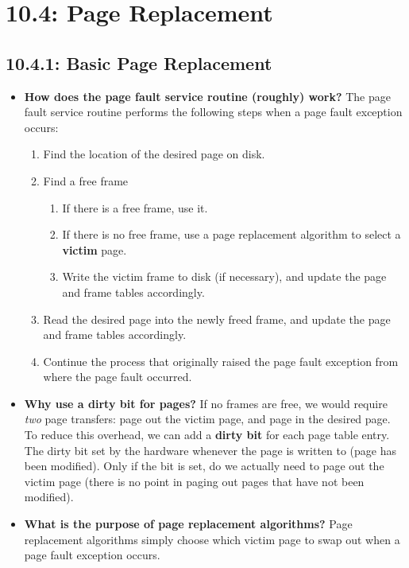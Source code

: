 \documentclass[12pt]{article}
\begin{document}
\section*{10.4: Page Replacement}

\subsection*{10.4.1: Basic Page Replacement}

\begin{itemize}
    \item \textbf{How does the page fault service routine (roughly) work?} The page fault service routine performs the following steps when a page fault exception occurs:
    \begin{enumerate}
        \item Find the location of the desired page on disk.
        \item Find a free frame
        \begin{enumerate}
            \item If there is a free frame, use it.
            \item If there is no free frame, use a page replacement algorithm to select a \textbf{victim} page.
            \item Write the victim frame to disk (if necessary), and update the page and frame tables accordingly.
        \end{enumerate}
        \item Read the desired page into the newly freed frame, and update the page and frame tables accordingly.
        \item Continue the process that originally raised the page fault exception from where the page fault occurred.
    \end{enumerate}
    \item \textbf{Why use a dirty bit for pages?} If no frames are free, we would require \textit{two} page transfers: page out the victim page, and page in the desired page. To reduce this overhead, we can add a \textbf{dirty bit} for each page table entry. The dirty bit set by the hardware whenever the page is written to (page has been modified). Only if the bit is set, do we actually need to page out the victim page (there is no point in paging out pages that have not been modified).
    \item \textbf{What is the purpose of page replacement algorithms?} Page replacement algorithms simply choose which victim page to swap out when a page fault exception occurs.

\end{itemize}
\end{document}
